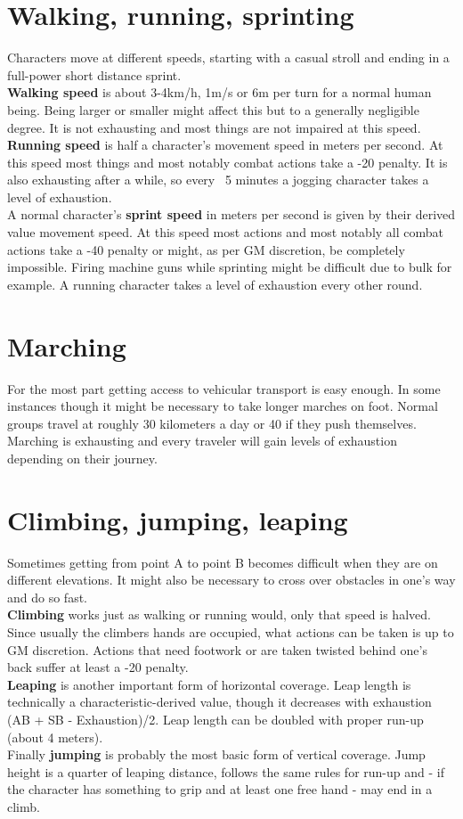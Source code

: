 \documentclass[12pt,a4paper]{book}
\begin{document}
	\section{Walking, running, sprinting}
	Characters move at different speeds, starting with a casual stroll and ending in a full-power short distance sprint.\\
	\textbf{Walking speed} is about 3-4km/h, 1m/s or 6m per turn for a normal human being. Being larger or smaller might affect this but to a generally negligible degree. It is not exhausting and most things are not impaired at this speed.\\
	\textbf{Running speed} is half a character’s movement speed in meters per second. At this speed most things and most notably combat actions take a -20 penalty. It is also exhausting after a while, so every ~5 minutes a jogging character takes a level of exhaustion.\\
	A normal character’s \textbf{sprint speed} in meters per second is given by their derived value movement speed. At this speed most actions and most notably all combat actions take a -40 penalty or might, as per GM discretion, be completely impossible. Firing machine guns while sprinting might be difficult due to bulk for example. A running character takes a level of exhaustion every other round.
	\section{Marching}
	For the most part getting access to vehicular transport is easy enough. In some instances though it might be necessary to take longer marches on foot. Normal groups travel at roughly 30 kilometers a day or 40 if they push themselves. Marching is exhausting and every traveler will gain levels of exhaustion depending on their journey.
	\section{Climbing, jumping, leaping}
	Sometimes getting from point A to point B becomes difficult when they are on different elevations. It might also be necessary to cross over obstacles in one’s way and do so fast.\\
	\textbf{Climbing} works just as walking or running would, only that speed is halved. Since usually the climbers hands are occupied, what actions can be taken is up to GM discretion. Actions that need footwork or are taken twisted behind one’s back suffer at least a -20 penalty.\\
	\textbf{Leaping} is another important form of horizontal coverage. Leap length is technically a characteristic-derived value, though it decreases with exhaustion (AB + SB - Exhaustion)/2. Leap length can be doubled with proper run-up (about 4 meters).\\
	Finally \textbf{jumping} is probably the most basic form of vertical coverage. Jump height is a quarter of leaping distance, follows the same rules for run-up and - if the character has something to grip and at least one free hand - may end in a climb.
\end{document}

